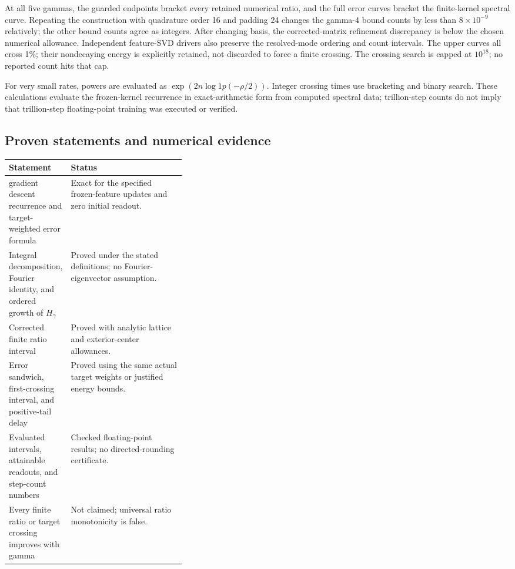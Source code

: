 \documentclass[11pt]{article}
\begin{document}
At all five gammas, the guarded endpoints bracket every retained numerical ratio, and the full error curves bracket the finite-kernel spectral curve. Repeating the construction with quadrature order 16 and padding 24 changes the gamma-4 bound counts by less than \(8\times10^{-9}\) relatively; the other bound counts agree as integers. After changing basis, the corrected-matrix refinement discrepancy is below the chosen numerical allowance. Independent feature-SVD drivers also preserve the resolved-mode ordering and count intervals. The upper curves all cross 1\%; their nondecaying energy is explicitly retained, not discarded to force a finite crossing. The crossing search is capped at \(10^{18}\); no reported count hits that cap.

For very small rates, powers are evaluated as \(\exp(2n\log1p(-\rho/2))\). Integer crossing times use bracketing and binary search. These calculations evaluate the frozen-kernel recurrence in exact-arithmetic form from computed spectral data; trillion-step counts do not imply that trillion-step floating-point training was executed or verified.

\subsection{Proven statements and numerical evidence}

\begin{center}\small\begin{tabularx}{\linewidth}{p{0.35\linewidth}X}
\toprule
Statement & Status \\
\midrule
gradient descent recurrence and target-weighted error formula & Exact for the specified frozen-feature updates and zero initial readout. \\
Integral decomposition, Fourier identity, and ordered growth of \(H_\gamma\) & Proved under the stated definitions; no Fourier-eigenvector assumption. \\
Corrected finite ratio interval & Proved with analytic lattice and exterior-center allowances. \\
Error sandwich, first-crossing interval, and positive-tail delay & Proved using the same actual target weights or justified energy bounds. \\
Evaluated intervals, attainable readouts, and step-count numbers & Checked floating-point results; no directed-rounding certificate. \\
Every finite ratio or target crossing improves with gamma & Not claimed; universal ratio monotonicity is false. \\
\bottomrule\end{tabularx}\end{center}
\end{document}
